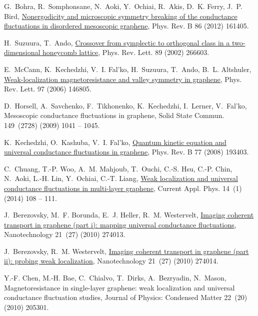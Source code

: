 \documentclass[final,5p,times,twocolumn]{elsarticle}
\begin{document}
\begin{thebibliography}{10}
G.~Bohra, R.~Somphonsane, N.~Aoki, Y.~Ochiai, R.~Akis, D.~K. Ferry, J.~P. Bird,
  \href{http://link.aps.org/doi/10.1103/PhysRevB.86.161405}{Nonergodicity and
  microscopic symmetry breaking of the conductance fluctuations in disordered
  mesoscopic graphene}, Phys. Rev. B 86 (2012) 161405.

H.~Suzuura, T.~Ando,
  \href{http://link.aps.org/doi/10.1103/PhysRevLett.89.266603}{Crossover from
  symplectic to orthogonal class in a two-dimensional honeycomb lattice}, Phys.
  Rev. Lett. 89 (2002) 266603.

E.~McCann, K.~Kechedzhi, V.~I. Fal'ko, H.~Suzuura, T.~Ando, B.~L. Altshuler,
  \href{http://link.aps.org/doi/10.1103/PhysRevLett.97.146805}{Weak-localization
  magnetoresistance and valley symmetry in graphene}, Phys. Rev. Lett. 97
  (2006) 146805.

D.~Horsell, A.~Savchenko, F.~Tikhonenko, K.~Kechedzhi, I.~Lerner, V.~Fal'ko,
  Mesoscopic conductance fluctuations in graphene, Solid State Commun.
  149~(2728) (2009) 1041 -- 1045.

K.~Kechedzhi, O.~Kashuba, V.~I. Fal'ko,
  \href{http://link.aps.org/doi/10.1103/PhysRevB.77.193403}{Quantum kinetic
  equation and universal conductance fluctuations in graphene}, Phys. Rev. B 77
  (2008) 193403.

C.~Chuang, T.-P. Woo, A.~M. Mahjoub, T.~Ouchi, C.-S. Hsu, C.-P. Chin, N.~Aoki,
  L.-H. Lin, Y.~Ochiai, C.-T. Liang,
  \href{http://www.sciencedirect.com/science/article/pii/S1567173913003441}{Weak
  localization and universal conductance fluctuations in multi-layer graphene},
  Current Appl. Phys. 14~(1) (2014) 108 -- 111.

J.~Berezovsky, M.~F. Borunda, E.~J. Heller, R.~M. Westervelt, 
  \href {http://dx.doi.org/10.1088/0957-4484/21/27/274013}{Imaging coherent
  transport in graphene (part i): mapping universal conductance fluctuations},
  Nanotechnology 21~(27) (2010) 274013.

J.~Berezovsky, R.~M. Westervelt, 
  \href {http://dx.doi.org/10.1088/0957-4484/21/27/274014}{Imaging coherent transport in graphene (part
  ii): probing weak localization}, Nanotechnology 21~(27) (2010) 274014.

Y.-F. Chen, M.-H. Bae, C.~Chialvo, T.~Dirks, A.~Bezryadin, N.~Mason,
  Magnetoresistance in single-layer graphene: weak localization and universal
  conductance fluctuation studies, Journal of Physics: Condensed Matter 22~(20)
  (2010) 205301.


\end{thebibliography}
\end{document}
